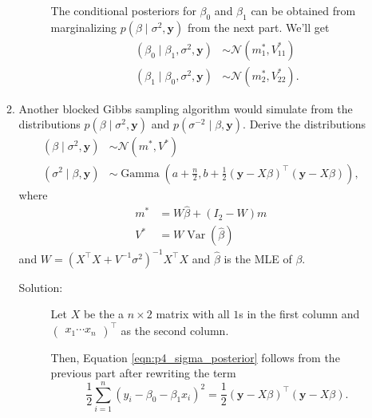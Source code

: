 \documentclass[letterpaper,11pt]{article}
\begin{document}
\begin{enumerate}
\begin{enumerate}
\begin{description}
      
      The conditional posteriors for $\beta_0$ and $\beta_1$ can be obtained
      from marginalizing $p\left(\beta \mid \sigma^2, \mathbf{y}\right)$ from
      the next part. We'll get
      \begin{align*}
        \left(\beta_0 \mid \beta_1, \sigma^2, \mathbf{y}\right)
        &\sim \mathcal{N}\left(m^*_1, V^*_{11}\right) \\
        \left(\beta_1 \mid \beta_0, \sigma^2, \mathbf{y}\right)
        &\sim \mathcal{N}\left(m^*_2, V^*_{22}\right).
      \end{align*}
    \end{description}
  \item Another blocked Gibbs sampling algorithm would simulate from the
    distributions $p\left(\beta \mid \sigma^2, \mathbf{y}\right)$ and
    $p\left(σ^{-2} \mid \beta, \mathbf{y}\right)$. Derive the distributions
    \begin{align}
      \left(\beta \mid \sigma^2, \mathbf{y} \right)
      &\sim \mathcal{N}\left(m^*, V^*\right)
      \label{eqn:p4_beta_posterior} \\
      \left(\sigma^2 \mid \beta, \mathbf{y} \right)
      &\sim \operatorname{Gamma}\left(
      a + \frac{n}{2}, b + \frac{1}{2}\left(\mathbf{y} - X\beta\right)^\intercal
      \left(\mathbf{y} - X\beta\right)
      \right),
      \label{eqn:p4_sigma_posterior}
    \end{align}
    where
    \begin{align*}
      m^* &= W\hat{\beta} + \left(I_2 - W\right)m \\
      V^* &= W\operatorname{Var}\left(\hat{\beta}\right)
    \end{align*}
    and $W = \left(X^\intercal X + V^{-1}\sigma^2\right)^{-1}X^\intercal X$ and
    $\hat{\beta}$ is the MLE of $\beta$.

    \begin{description}
    \item[Solution:] Let $X$ be the a $n \times 2$ matrix with all $1$s in the
      first column and $\begin{pmatrix} x_1 \cdots x_n\end{pmatrix}^\intercal$
      as the second column.

      Then, Equation \ref{eqn:p4_sigma_posterior} follows from the previous part
      after rewriting the term
      \begin{equation}
        \frac{1}{2}\sum_{i=1}^n\left(y_i - \beta_0 - \beta_1x_i\right)^2
        = \frac{1}{2}\left(\mathbf{y} - X\beta\right)^\intercal\left(\mathbf{y} - X\beta\right).
      \end{equation}


\end{description}
\end{enumerate}
\end{enumerate}
\end{document}
